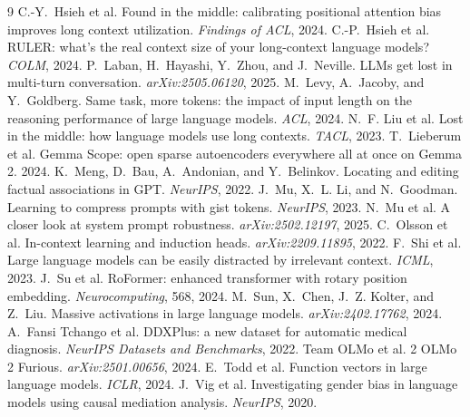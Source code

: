 \documentclass{article}
\begin{document}
\begin{thebibliography}{9}
 C.-Y.~Hsieh et al. Found in the middle: calibrating positional attention bias improves long context utilization. \emph{Findings of ACL}, 2024.
 C.-P.~Hsieh et al. RULER: what's the real context size of your long-context language models? \emph{COLM}, 2024.
 P.~Laban, H.~Hayashi, Y.~Zhou, and J.~Neville. LLMs get lost in multi-turn conversation. \emph{arXiv:2505.06120}, 2025.
 M.~Levy, A.~Jacoby, and Y.~Goldberg. Same task, more tokens: the impact of input length on the reasoning performance of large language models. \emph{ACL}, 2024.
 N.~F. Liu et al. Lost in the middle: how language models use long contexts. \emph{TACL}, 2023.
 T.~Lieberum et al. Gemma Scope: open sparse autoencoders everywhere all at once on Gemma 2. 2024.
 K.~Meng, D.~Bau, A.~Andonian, and Y.~Belinkov. Locating and editing factual associations in GPT. \emph{NeurIPS}, 2022.
 J.~Mu, X.~L. Li, and N.~Goodman. Learning to compress prompts with gist tokens. \emph{NeurIPS}, 2023.
 N.~Mu et al. A closer look at system prompt robustness. \emph{arXiv:2502.12197}, 2025.
 C.~Olsson et al. In-context learning and induction heads. \emph{arXiv:2209.11895}, 2022.
 F.~Shi et al. Large language models can be easily distracted by irrelevant context. \emph{ICML}, 2023.
 J.~Su et al. RoFormer: enhanced transformer with rotary position embedding. \emph{Neurocomputing}, 568, 2024.
 M.~Sun, X.~Chen, J.~Z. Kolter, and Z.~Liu. Massive activations in large language models. \emph{arXiv:2402.17762}, 2024.
 A.~Fansi Tchango et al. DDXPlus: a new dataset for automatic medical diagnosis. \emph{NeurIPS Datasets and Benchmarks}, 2022.
 Team OLMo et al. 2 OLMo 2 Furious. \emph{arXiv:2501.00656}, 2024.
 E.~Todd et al. Function vectors in large language models. \emph{ICLR}, 2024.
 J.~Vig et al. Investigating gender bias in language models using causal mediation analysis. \emph{NeurIPS}, 2020.

\end{thebibliography}
\end{document}
